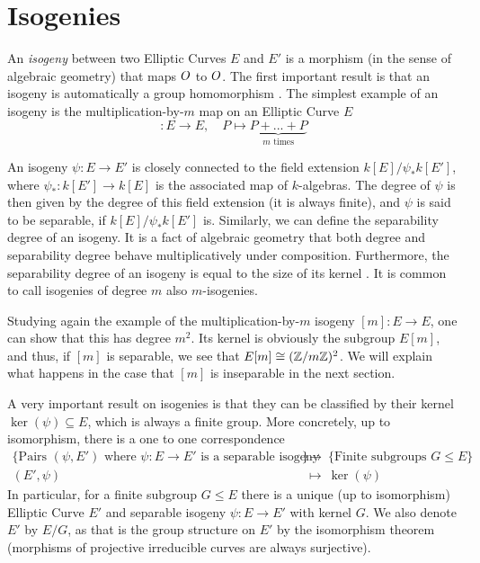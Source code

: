 \section{Isogenies}
An \emph{isogeny} between two Elliptic Curves $E$ and $E'$ is a morphism (in the sense of algebraic geometry) that maps $O$ to $O$.
The first important result is that an isogeny is automatically a group homomorphism \cite[Thm~III.4.8]{arithmetic_elliptic_curves}.
The simplest example of an isogeny is the multiplication-by-$m$ map on an Elliptic Curve $E$
\begin{equation*}
    [m]: E \to E, \quad P \mapsto \underbrace{P + ... + P}_{\text{$m$ times}}
\end{equation*}

An isogeny $\psi: E \to E'$ is closely connected to the field extension $k[E]/\psi_*k[E']$, where $\psi_*: k[E'] \to k[E]$ is the associated map of $k$-algebras.
The degree of $\psi$ is then given by the degree of this field extension (it is always finite), and $\psi$ is said to be separable, if $k[E]/\psi_*k[E']$ is.
Similarly, we can define the separability degree of an isogeny.
It is a fact of algebraic geometry that both degree and separability degree behave multiplicatively under composition.
Furthermore, the separability degree of an isogeny is equal to the size of its kernel \cite[Thm~III.4.10]{arithmetic_elliptic_curves}.
It is common to call isogenies of degree $m$ also $m$-isogenies.

Studying again the example of the multiplication-by-$m$ isogeny $[m]: E \to E$, one can show that this has degree $m^2$.
Its kernel is obviously the subgroup $E[m]$, and thus, if $[m]$ is separable, we see that $E[m] \cong (\mathbb{Z}/m\mathbb{Z})^2$.
We will explain what happens in the case that $[m]$ is inseparable in the next section.

A very important result on isogenies is that they can be classified by their kernel $\ker(\psi) \subseteq E$, which is always a finite group.
More concretely, up to isomorphism, there is a one to one correspondence
\begin{align*}
    \{ \text{Pairs $(\psi, E')$ where $\psi: E \to E'$ is a separable isogeny} \}  \ &\to \ \{ \text{Finite subgroups $G \leq E$} \} \\
    (E', \psi) \ &\mapsto \ \ker(\psi)
\end{align*}
In particular, for a finite subgroup $G \leq E$ there is a unique (up to isomorphism) Elliptic Curve $E'$ and separable isogeny $\psi: E \to E'$ with kernel $G$.
We also denote $E'$ by $E/G$, as that is the group structure on $E'$ by the isomorphism theorem (morphisms of projective irreducible curves are always surjective).

